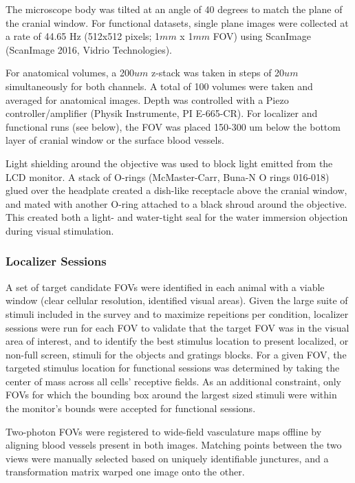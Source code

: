  
The microscope body was tilted at an angle of 40 degrees to match the plane of the cranial window. For functional datasets, single plane images were collected at a rate of 44.65 Hz (512x512 pixels; 1$mm$ x 1$mm$ FOV) using ScanImage\cite{Pologruto2003} (ScanImage 2016, Vidrio Technologies). 

For anatomical volumes, a 200$um$ z-stack was taken in steps of 20$um$ simultaneously for both channels. A total of 100 volumes were taken and averaged for anatomical images. Depth was controlled with a Piezo controller/amplifier (Physik Instrumente, PI E-665-CR). For localizer and functional runs (see below), the FOV was placed 150-300 um below the bottom layer of cranial window or the surface blood vessels. 

Light shielding around the objective was used to block light emitted from the LCD monitor. A stack of O-rings (McMaster-Carr, Buna-N O rings 016-018) glued over the headplate created a dish-like receptacle above the cranial window\cite{Goldey2014}, and mated with another O-ring attached to a black shroud around the objective. This created both a light- and water-tight seal for the water immersion objection during visual stimulation. 

\subsubsection{Localizer Sessions}
A set of target candidate FOVs were identified in each animal with a viable window (clear cellular resolution, identified visual areas). Given the large suite of stimuli included in the survey and to maximize repeitions per condition, localizer sessions were run for each FOV to validate that the target FOV was in the visual area of interest, and to identify the best stimulus location to present localized, or non-full screen, stimuli for the objects and gratings blocks. For a given FOV, the targeted stimulus location for functional sessions was determined by taking the center of mass across all cells' receptive fields. As an additional constraint, only FOVs for which the bounding box around the largest sized stimuli were within the monitor's bounds were accepted for functional sessions.

Two-photon FOVs were registered to wide-field vasculature maps offline by aligning blood vessels present in both images. Matching points between the two views were manually selected based on uniquely identifiable junctures, and a transformation matrix warped one image onto the other. 

